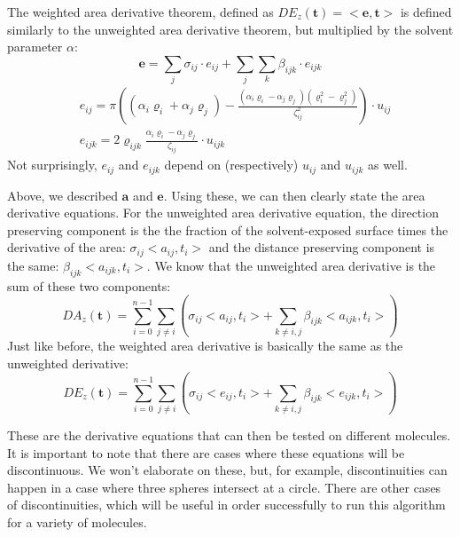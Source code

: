 \documentclass{article}
\begin{document}
The weighted area derivative theorem, defined as $DE_z(\textbf{t}) = <\textbf{e},\textbf{t}>$ is defined similarly to the unweighted area derivative theorem, but multiplied by the solvent parameter $\alpha$:
\begin{equation}
\textbf{e} = \sum_j \sigma_{ij}\cdot e_{ij}+ \sum_j \sum_k \beta_{ijk}\cdot e_{ijk}
\end{equation}
\begin{align*}
&e_{ij} = \pi\left((\alpha_i\varrho_i +\alpha_j\varrho_j) - \frac{(\alpha_i\varrho_i  - \alpha_j \varrho_j)(\varrho_i^2 - \varrho_j^2)}{\zeta_{ij}^2}\right)\cdot u_{ij} \\
&e_{ijk} = 2\varrho_{ijk}\frac{\alpha_i\varrho_i - \alpha_j\varrho_j}{\zeta_{ij}}\cdot u_{ijk}
\end{align*}
Not surprisingly, $e_{ij}$ and $e_{ijk}$ depend on (respectively) $u_{ij}$ and $u_{ijk}$ as well.

Above, we described $\textbf{a}$ and $\textbf{e}$. Using these, we can then clearly state the area derivative equations. For the unweighted area derivative equation, the direction preserving component is the the fraction of the solvent-exposed surface times the derivative of the area: $\sigma_{ij}<a_{ij},t_i>$ and the distance preserving component is the same: $\beta_{ijk}<a_{ijk},t_i>$. We know that the unweighted area derivative is the sum of these two components:
\begin{equation}
DA_z(\textbf{t}) = \sum_{i=0}^{n-1}\sum_{j\neq i}\left(\sigma_{ij}<a_{ij},t_i> + \sum_{k\neq i,j} \beta_{ijk}<a_{ijk},t_i>\right)
\end{equation}
Just like before, the weighted area derivative is basically the same as the unweighted derivative: 
\begin{equation}
DE_z(\textbf{t}) = \sum_{i=0}^{n-1}\sum_{j\neq i}\left(\sigma_{ij}<e_{ij},t_i> + \sum_{k\neq i,j} \beta_{ijk}<e_{ijk},t_i>\right)
\end{equation}

These are the derivative equations that can then be tested on different molecules. It is important to note that there are cases where these equations will be discontinuous. We won't elaborate on these, but, for example, discontinuities can happen in a case where three spheres intersect at a circle. There are other cases of discontinuities, which will be useful in order successfully to run this algorithm for a variety of molecules.

\end{document}
